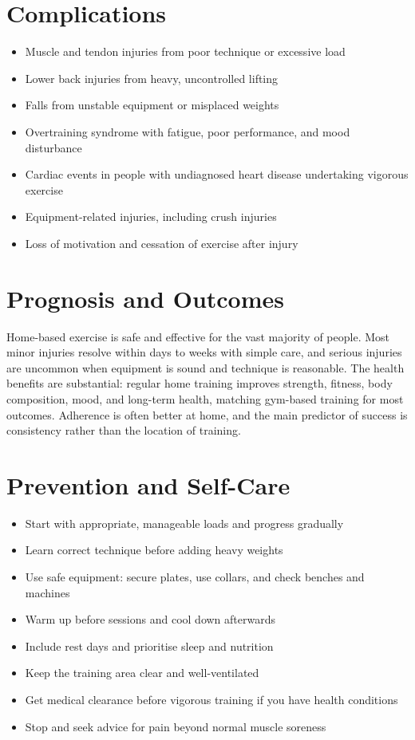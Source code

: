 \section*{Complications}
\begin{itemize}
    \item Muscle and tendon injuries from poor technique or excessive load
    \item Lower back injuries from heavy, uncontrolled lifting
    \item Falls from unstable equipment or misplaced weights
    \item Overtraining syndrome with fatigue, poor performance, and mood disturbance
    \item Cardiac events in people with undiagnosed heart disease undertaking vigorous exercise
    \item Equipment-related injuries, including crush injuries
    \item Loss of motivation and cessation of exercise after injury
\end{itemize}

\section*{Prognosis and Outcomes}
Home-based exercise is safe and effective for the vast majority of people. Most minor injuries resolve within days to weeks with simple care, and serious injuries are uncommon when equipment is sound and technique is reasonable. The health benefits are substantial: regular home training improves strength, fitness, body composition, mood, and long-term health, matching gym-based training for most outcomes. Adherence is often better at home, and the main predictor of success is consistency rather than the location of training.

\section*{Prevention and Self-Care}
\begin{itemize}
    \item Start with appropriate, manageable loads and progress gradually
    \item Learn correct technique before adding heavy weights
    \item Use safe equipment: secure plates, use collars, and check benches and machines
    \item Warm up before sessions and cool down afterwards
    \item Include rest days and prioritise sleep and nutrition
    \item Keep the training area clear and well-ventilated
    \item Get medical clearance before vigorous training if you have health conditions
    \item Stop and seek advice for pain beyond normal muscle soreness
\end{itemize}

